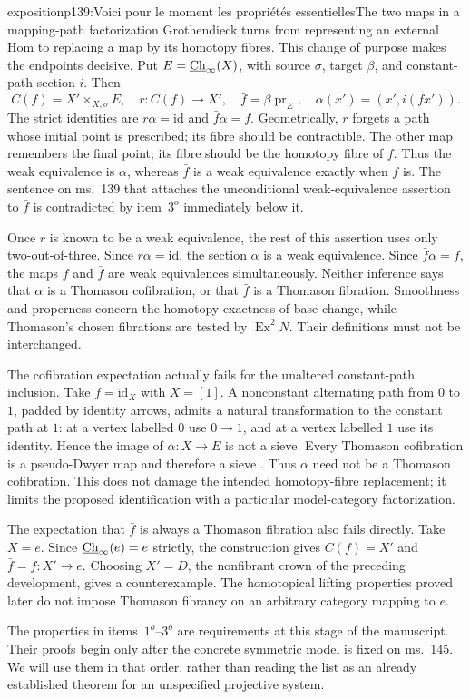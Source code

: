 \begin{dcomment}{exposition}{p139:Voici pour le moment les propriétés essentielles}{The two maps in a mapping-path factorization}
Grothendieck turns from representing an external Hom to replacing a map by its homotopy fibres. This change of purpose makes the endpoints decisive. Put $E=\underline{\mathrm{Ch}}_\infty(X)$, with source $\sigma$, target $\beta$, and constant-path section $i$. Then
\[
 C(f)=X'\times_{X,\sigma}E,
 \quad r:C(f)\longrightarrow X',
 \quad \bar f=\beta\operatorname{pr}_E,
 \quad \alpha(x')=(x',i(fx')).
\]
The strict identities are $r\alpha=\mathrm{id}$ and $\bar f\alpha=f$. Geometrically, $r$ forgets a path whose initial point is prescribed; its fibre should be contractible. The other map remembers the final point; its fibre should be the homotopy fibre of $f$. Thus the weak equivalence is $\alpha$, whereas $\bar f$ is a weak equivalence exactly when $f$ is. The sentence on ms.~139 that attaches the unconditional weak-equivalence assertion to $\bar f$ is contradicted by item~$3^o$ immediately below it.

Once $r$ is known to be a weak equivalence, the rest of this assertion uses only two-out-of-three. Since $r\alpha=\mathrm{id}$, the section $\alpha$ is a weak equivalence. Since $\bar f\alpha=f$, the maps $f$ and $\bar f$ are weak equivalences simultaneously. Neither inference says that $\alpha$ is a Thomason cofibration, or that $\bar f$ is a Thomason fibration. Smoothness and properness concern the homotopy exactness of base change, while Thomason's chosen fibrations are tested by $\operatorname{Ex}^2N$. Their definitions must not be interchanged.

The cofibration expectation actually fails for the unaltered constant-path inclusion. Take $f=\mathrm{id}_X$ with $X=[1]$. A nonconstant alternating path from $0$ to $1$, padded by identity arrows, admits a natural transformation to the constant path at $1$: at a vertex labelled $0$ use $0\to1$, and at a vertex labelled $1$ use its identity. Hence the image of $\alpha:X\to E$ is not a sieve. Every Thomason cofibration is a pseudo-Dwyer map and therefore a sieve \citep[\S2, following Proposition~2.4]{Raptis2010}. Thus $\alpha$ need not be a Thomason cofibration. This does not damage the intended homotopy-fibre replacement; it limits the proposed identification with a particular model-category factorization.

The expectation that $\bar f$ is always a Thomason fibration also fails directly. Take $X=e$. Since $\underline{\mathrm{Ch}}_\infty(e)=e$ strictly, the construction gives $C(f)=X'$ and $\bar f=f:X'\to e$. Choosing $X'=D$, the nonfibrant crown of the preceding development, gives a counterexample. The homotopical lifting properties proved later do not impose Thomason fibrancy on an arbitrary category mapping to $e$.

The properties in items~$1^o$--$3^o$ are requirements at this stage of the manuscript. Their proofs begin only after the concrete symmetric model is fixed on ms.~145. We will use them in that order, rather than reading the list as an already established theorem for an unspecified projective system.
\end{dcomment}


